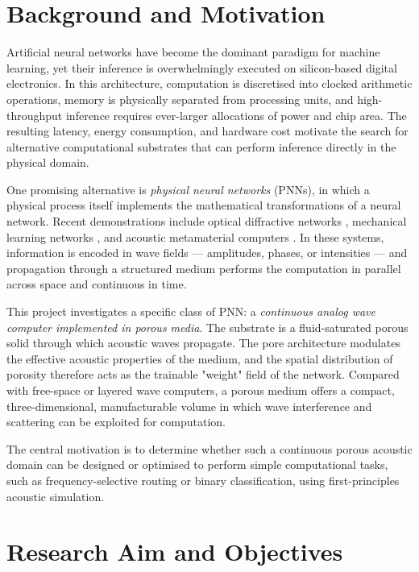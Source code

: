 
\section{Background and Motivation}
\label{sec:background}

Artificial neural networks have become the dominant paradigm for machine learning, yet their inference is overwhelmingly executed on silicon-based digital electronics. In this architecture, computation is discretised into clocked arithmetic operations, memory is physically separated from processing units, and high-throughput inference requires ever-larger allocations of power and chip area. The resulting latency, energy consumption, and hardware cost motivate the search for alternative computational substrates that can perform inference directly in the physical domain.

One promising alternative is \emph{physical neural networks} (PNNs), in which a physical process itself implements the mathematical transformations of a neural network. Recent demonstrations include optical diffractive networks \cite{lin2018alloptical}, mechanical learning networks \cite{stern2020supervised}, and acoustic metamaterial computers \cite{zuo2018acoustic}. In these systems, information is encoded in wave fields --- amplitudes, phases, or intensities --- and propagation through a structured medium performs the computation in parallel across space and continuous in time.

This project investigates a specific class of PNN: a \emph{continuous analog wave computer implemented in porous media}. The substrate is a fluid-saturated porous solid through which acoustic waves propagate. The pore architecture modulates the effective acoustic properties of the medium, and the spatial distribution of porosity therefore acts as the trainable "weight" field of the network. Compared with free-space or layered wave computers, a porous medium offers a compact, three-dimensional, manufacturable volume in which wave interference and scattering can be exploited for computation.

The central motivation is to determine whether such a continuous porous acoustic domain can be designed or optimised to perform simple computational tasks, such as frequency-selective routing or binary classification, using first-principles acoustic simulation.

\section{Research Aim and Objectives}
\label{sec:aim}

